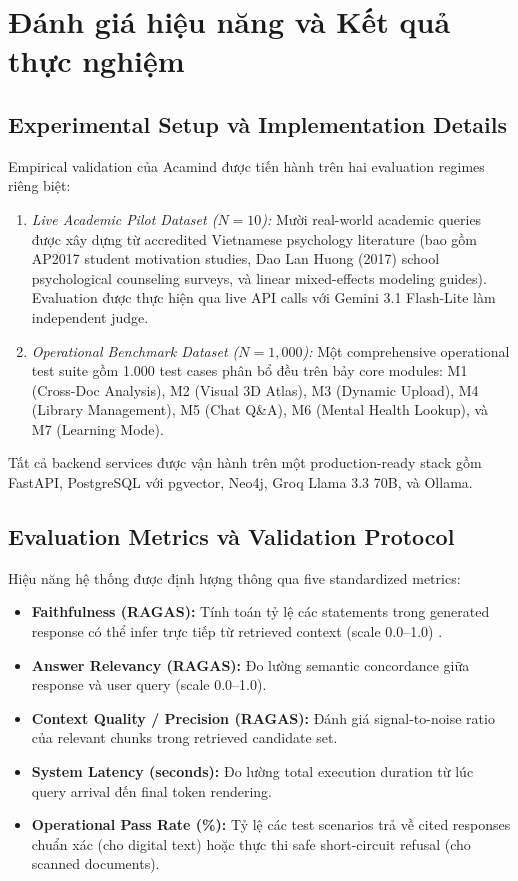 \documentclass[10pt]{SPIIRAS_Proceedings}
\begin{document}
\section{Đánh giá hiệu năng và Kết quả thực nghiệm}\label{sec:experiments}

\subsection{Experimental Setup và Implementation Details}
Empirical validation của Acamind được tiến hành trên hai evaluation regimes riêng biệt:
\begin{enumerate}
    \item \textit{Live Academic Pilot Dataset ($N=10$):} Mười real-world academic queries được xây dựng từ accredited Vietnamese psychology literature (bao gồm AP2017 student motivation studies, Dao Lan Huong (2017) school psychological counseling surveys, và linear mixed-effects modeling guides). Evaluation được thực hiện qua live API calls với Gemini 3.1 Flash-Lite làm independent judge.
    \item \textit{Operational Benchmark Dataset ($N=1,000$):} Một comprehensive operational test suite gồm 1.000 test cases phân bổ đều trên bảy core modules: M1 (Cross-Doc Analysis), M2 (Visual 3D Atlas), M3 (Dynamic Upload), M4 (Library Management), M5 (Chat Q\&A), M6 (Mental Health Lookup), và M7 (Learning Mode).
\end{enumerate}

Tất cả backend services được vận hành trên một production-ready stack gồm FastAPI, PostgreSQL với pgvector, Neo4j, Groq Llama 3.3 70B, và Ollama.

\subsection{Evaluation Metrics và Validation Protocol}
Hiệu năng hệ thống được định lượng thông qua five standardized metrics:
\begin{itemize}
    \item \textbf{Faithfulness (RAGAS):} Tính toán tỷ lệ các statements trong generated response có thể infer trực tiếp từ retrieved context (scale 0.0--1.0) \cite{min2023factscore}.
    \item \textbf{Answer Relevancy (RAGAS):} Đo lường semantic concordance giữa response và user query (scale 0.0--1.0).
    \item \textbf{Context Quality / Precision (RAGAS):} Đánh giá signal-to-noise ratio của relevant chunks trong retrieved candidate set.
    \item \textbf{System Latency (seconds):} Đo lường total execution duration từ lúc query arrival đến final token rendering.
    \item \textbf{Operational Pass Rate (\%):} Tỷ lệ các test scenarios trả về cited responses chuẩn xác (cho digital text) hoặc thực thi safe short-circuit refusal (cho scanned documents).
\end{itemize}
\end{document}
